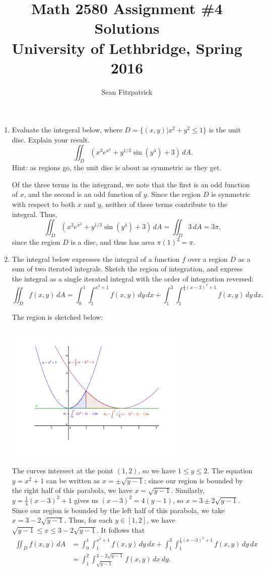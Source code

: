 \documentclass[letterpaper,12pt]{article}
\title{Math 2580 Assignment \#4 Solutions\\University of Lethbridge, Spring 2016}
\author{Sean Fitzpatrick}
\begin{document}
 \maketitle


\begin{enumerate}
 \item Evaluate the integeral below, where $D=\{(x,y) | x^2+y^2\leq 1\}$ is the unit disc. Explain your result.
\[
 \iint_D (x^3e^{x^2}+y^{1/3}\sin(y^4)+3)\,dA.
\]
Hint: as regions go, the unit disc is about as symmetric as they get.

\bigskip

Of the three terms in the integrand, we note that the first is an odd function of $x$, and the second is an odd function of $y$. Since the region $D$ is symmetric with respect to both $x$ and $y$, neither of these terms contribute to the integral. Thus, 
\[
 \iint_D (x^3e^{x^2}+y^{1/3}\sin(y^4)+3)\,dA = \iint_D 3\,dA = 3\pi,
\]
since the region $D$ is a disc, and thus has area $\pi(1)^2=\pi$.

 \item The integral below expresses the integral of a function $f$ over a region $D$ as a sum of two iterated integrals. Sketch the region of integration, and express the integral as a single iterated integral with the order of integration reversed:
\[
 \iint_D f(x,y)\,dA = \int_0^1\int_1^{x^2+1}f(x,y)\,dy\,dx + \int_1^3\int_1^{\frac{1}{4}(x-3)^2+1}f(x,y)\,dy\,dx.
\]

The region is sketched below:
\begin{center}
 \includegraphics[width=0.7\textwidth]{WS4-1c}
\end{center}
The curves intersect at the point $(1,2)$, so we have $1\leq y\leq 2$. The equation $y=x^2+1$ can be written as $x=\pm \sqrt{y-1}$; since our region is bounded by the right half of this parabola, we have $x=\sqrt{y-1}$.  Similarly, $y=\frac{1}{4}(x-3)^2+1$ gives us $(x-3)^2 = 4(y-1)$, so $x=3\pm 2\sqrt{y-1}$. Since our region is bounded by the left half of this parabola, we take $x=3-2\sqrt{y-1}$. Thus, for each $y\in [1,2]$, we have $\sqrt{y-1}\leq x\leq 3-2\sqrt{y-1}$. It follows that
\begin{align*}
 \iint_D f(x,y)\,dA &= \int_0^1\int_1^{x^2+1}f(x,y)\,dy\,dx + \int_1^3\int_1^{\frac{1}{4}(x-3)^2+1}f(x,y)\,dy\,dx\\
& = \int_1^2\int_{\sqrt{y-1}}^{3-2\sqrt{y-1}}f(x,y)\,dx\,dy.
\end{align*}


\end{enumerate}
\end{document}
